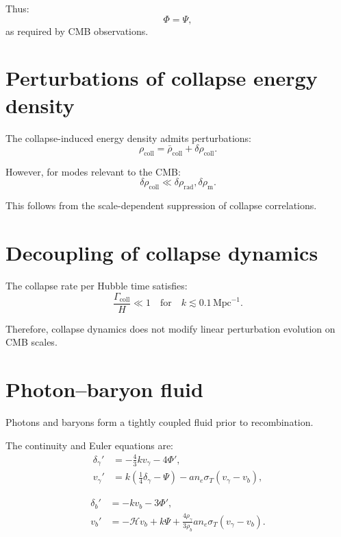 \documentclass[11pt]{book}
\begin{document}
Thus:
\begin{equation}
\Phi = \Psi,
\end{equation}
as required by CMB observations.

\section{Perturbations of collapse energy density}

The collapse-induced energy density admits perturbations:
\begin{equation}
\rho_{\mathrm{coll}} = \bar{\rho}_{\mathrm{coll}} + \delta\rho_{\mathrm{coll}}.
\end{equation}

However, for modes relevant to the CMB:
\begin{equation}
\delta\rho_{\mathrm{coll}} \ll \delta\rho_{\mathrm{rad}}, \delta\rho_{\mathrm{m}}.
\end{equation}

This follows from the scale-dependent suppression of collapse correlations.

\section{Decoupling of collapse dynamics}

The collapse rate per Hubble time satisfies:
\begin{equation}
\frac{\Gamma_{\mathrm{coll}}}{H} \ll 1
\quad
\text{for}
\quad
k \lesssim 0.1\,\mathrm{Mpc}^{-1}.
\end{equation}

Therefore, collapse dynamics does not modify linear perturbation evolution
on CMB scales.

\section{Photon--baryon fluid}

Photons and baryons form a tightly coupled fluid prior to recombination.

The continuity and Euler equations are:
\begin{align}
\delta_\gamma' &= -\frac{4}{3} k v_\gamma - 4\Phi', \\
v_\gamma' &= k\left(\frac{1}{4}\delta_\gamma - \Psi\right) - a n_e \sigma_T (v_\gamma - v_b),
\end{align}

\begin{align}
\delta_b' &= -k v_b - 3\Phi', \\
v_b' &= -\mathcal{H} v_b + k\Psi + \frac{4\rho_\gamma}{3\rho_b}
a n_e \sigma_T (v_\gamma - v_b).
\end{align}
\end{document}
